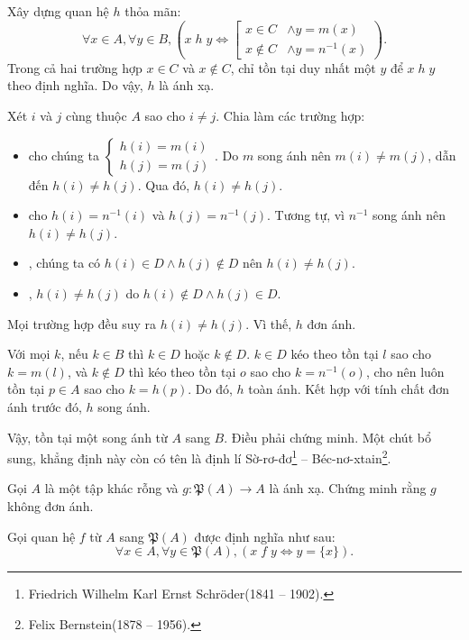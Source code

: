 Xây dựng quan hệ $h$ thỏa mãn:
$$
\forall x \in A, \forall y \in B, \left(x\;h\;y \iff \left[\begin{aligned}
   x \in C &\land y = m(x) \\
   x \notin C &\land y = n^{-1}(x)
\end{aligned}\right.\right).
$$
Trong cả hai trường hợp $x \in C$ và $x \notin C$, chỉ tồn tại duy nhất một $y$ để $x\;h\;y$ theo định nghĩa. Do vậy, $h$ là ánh xạ.

Xét $i$ và $j$ cùng thuộc $A$ sao cho $i \neq j$. Chia làm các trường hợp:
\begin{itemize}
   \item {} cho chúng ta $\begin{cases}
      h(i) = m(i) \\
      h(j) = m(j)
   \end{cases}$. Do $m$ song ánh nên $m(i) \neq m(j)$, dẫn đến $h(i) \neq h(j)$. Qua đó, $h(i) \neq h(j)$.
   \item {} cho $h(i) = n^{-1}(i)$ và $h(j) = n^{-1}(j)$. Tương tự, vì $n^{-1}$ song ánh nên $h(i) \neq h(j)$.
   \item {}, chúng ta có $h(i) \in D \land h(j) \notin D$ nên $h(i) \neq h(j)$.
   \item {}, $h(i) \neq h(j)$ do $h(i) \notin D \land h(j) \in D$.
\end{itemize}
Mọi trường hợp đều suy ra $h(i) \neq h(j)$. Vì thế, $h$ đơn ánh.

Với mọi $k$, nếu $k \in B$ thì $k \in D$ hoặc $k \notin D$. $k \in D$ kéo theo tồn tại $l$ sao cho $k = m(l)$, và $k \notin D$ thì kéo theo tồn tại $o$ sao cho $k = n^{-1}(o)$, cho nên luôn tồn tại $p \in A$ sao cho $k = h(p)$. Do đó, $h$ toàn ánh. Kết hợp với tính chất đơn ánh trước đó, $h$ song ánh.

Vậy, tồn tại một song ánh từ $A$ sang $B$. Điều phải chứng minh. Một chút bổ sung, khẳng định này còn có tên là định lí Sờ-rơ-đơ\footnote{Friedrich Wilhelm Karl Ernst Schröder(1841 -- 1902).} -- Béc-nơ-xtain\footnote{Felix Bernstein(1878 -- 1956).}.

\exercise Gọi $A$ là một tập khác rỗng và $g: \mathfrak{P}(A) \to A$ là ánh xạ. Chứng minh rằng $g$ không đơn ánh.

\solution

Gọi quan hệ $f$ từ $A$ sang $\mathfrak{P}(A)$ được định nghĩa như sau:
$$
\forall x \in A, \forall y \in \mathfrak{P}(A), \left(x\;f\;y \iff y = \{x\}\right).
$$


